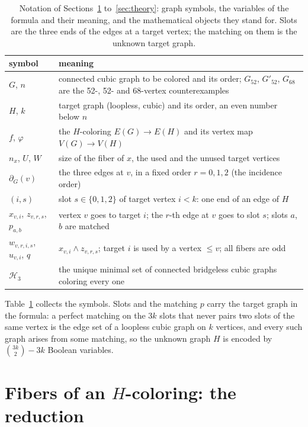 \documentclass[11pt]{article}
\theoremstyle{definition}
\theoremstyle{remark}
\newcommand{\Ga}{G_{52}}
\newcommand{\Gb}{G'_{52}}
\newcommand{\Gsix}{G_{68}}
\begin{document}
\begin{table}[t]\centering\small
\begin{tabular}{lp{}}
\toprule
symbol & meaning \\
\midrule
$G$, $n$ & connected cubic graph to be colored and its order; $\Ga$, $\Gb$, $\Gsix$ are the 52-, 52- and 68-vertex counterexamples \\
$H$, $k$ & target graph (loopless, cubic) and its order, an even number below $n$ \\
$f$, $\varphi$ & the $H$-coloring $E(G) \to E(H)$ and its vertex map $V(G) \to V(H)$ \\
$n_x$, $U$, $W$ & size of the fiber of $x$, the used and the unused target vertices \\
$\partial_G(v)$ & the three edges at $v$, in a fixed order $r = 0, 1, 2$ (the incidence order) \\
$(i,s)$ & slot $s \in \{0,1,2\}$ of target vertex $i < k$: one end of an edge of $H$ \\
$x_{v,i}$, $z_{v,r,s}$, $p_{a,b}$ & vertex $v$ goes to target $i$; the $r$-th edge at $v$ goes to slot $s$; slots $a$, $b$ are matched \\
$w_{v,r,i,s}$, $u_{v,i}$, $q$ & $x_{v,i} \wedge z_{v,r,s}$; target $i$ is used by a vertex $\le v$; all fibers are odd \\
$\mathcal{H}_3$ & the unique minimal set of connected bridgeless cubic graphs coloring every one \\
\bottomrule
\end{tabular}
\caption{Notation of Sections~\ref{sec:fibers} to~\ref{sec:theory}: graph symbols, the variables of the formula and their meaning, and the
mathematical objects they stand for. Slots are the three ends of the edges at a target vertex; the matching on them is the unknown target graph.}\label{tab:notation}
\end{table}

Table~\ref{tab:notation} collects the symbols. Slots and the matching $p$ carry the target graph in the formula: a perfect matching on the $3k$ slots that
never pairs two slots of the same vertex is the edge set of a loopless cubic graph on $k$ vertices, and every such graph arises from some matching,
so the unknown graph $H$ is encoded by $\binom{3k}{2} - 3k$ Boolean variables.

\section{Fibers of an \texorpdfstring{$H$}{H}-coloring: the reduction}\label{sec:fibers}
\end{document}
